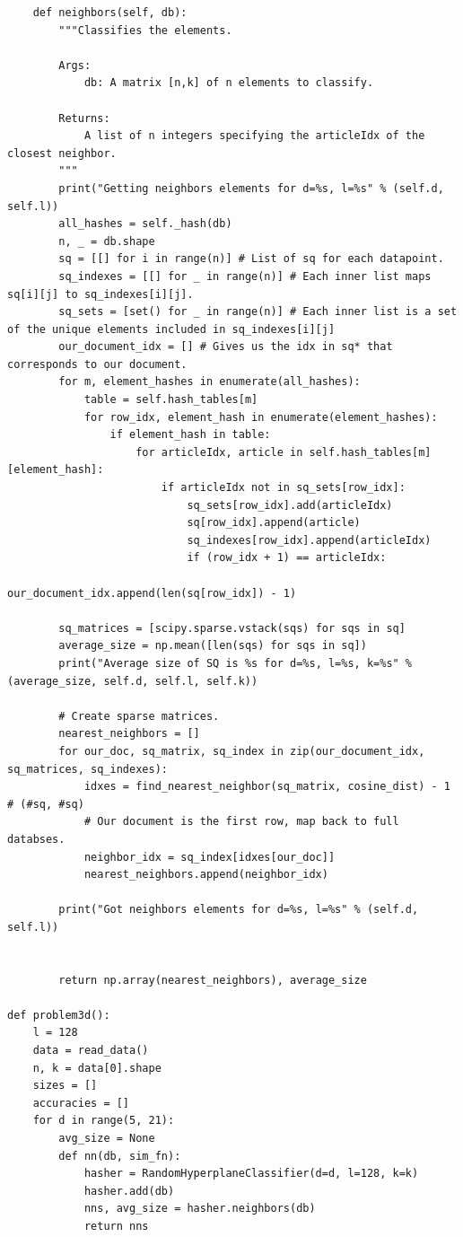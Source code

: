 \documentclass[12pt]{article}
\begin{document}
\begin{enumerate}[label=(\alph*)]
\begin{verbatim}
    def neighbors(self, db):
        """Classifies the elements.
        
        Args:
            db: A matrix [n,k] of n elements to classify.
        
        Returns:
            A list of n integers specifying the articleIdx of the closest neighbor.
        """
        print("Getting neighbors elements for d=%s, l=%s" % (self.d, self.l))
        all_hashes = self._hash(db)
        n, _ = db.shape
        sq = [[] for i in range(n)] # List of sq for each datapoint.
        sq_indexes = [[] for _ in range(n)] # Each inner list maps sq[i][j] to sq_indexes[i][j].
        sq_sets = [set() for _ in range(n)] # Each inner list is a set of the unique elements included in sq_indexes[i][j]
        our_document_idx = [] # Gives us the idx in sq* that corresponds to our document.
        for m, element_hashes in enumerate(all_hashes):
            table = self.hash_tables[m]
            for row_idx, element_hash in enumerate(element_hashes):
                if element_hash in table:
                    for articleIdx, article in self.hash_tables[m][element_hash]:
                        if articleIdx not in sq_sets[row_idx]:
                            sq_sets[row_idx].add(articleIdx)
                            sq[row_idx].append(article)
                            sq_indexes[row_idx].append(articleIdx)
                            if (row_idx + 1) == articleIdx:
                                our_document_idx.append(len(sq[row_idx]) - 1)
        
        sq_matrices = [scipy.sparse.vstack(sqs) for sqs in sq]
        average_size = np.mean([len(sqs) for sqs in sq])
        print("Average size of SQ is %s for d=%s, l=%s, k=%s" %(average_size, self.d, self.l, self.k))
        
        # Create sparse matrices.
        nearest_neighbors = []
        for our_doc, sq_matrix, sq_index in zip(our_document_idx, sq_matrices, sq_indexes):
            idxes = find_nearest_neighbor(sq_matrix, cosine_dist) - 1 # (#sq, #sq)
            # Our document is the first row, map back to full databses.
            neighbor_idx = sq_index[idxes[our_doc]]
            nearest_neighbors.append(neighbor_idx)
        
        print("Got neighbors elements for d=%s, l=%s" % (self.d, self.l))
        

        return np.array(nearest_neighbors), average_size

def problem3d():
    l = 128
    data = read_data()
    n, k = data[0].shape
    sizes = []
    accuracies = []
    for d in range(5, 21):
        avg_size = None
        def nn(db, sim_fn):
            hasher = RandomHyperplaneClassifier(d=d, l=128, k=k)
            hasher.add(db)
            nns, avg_size = hasher.neighbors(db)
            return nns


\end{verbatim}
\end{enumerate}
\end{document}
